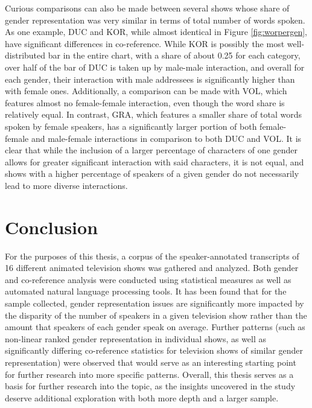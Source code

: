 \documentclass[a4paper, 11pt]{article}
\begin{document}
Curious comparisons can also be made between several shows whose share of gender representation was very similar in terms of total number of words spoken. As one example, DUC and KOR, while almost identical in Figure \ref{fig:worpergen}, have significant differences in co-reference. While KOR is possibly the most well-distributed bar in the entire chart, with a share of about 0.25 for each category, over half of the bar of DUC is taken up by male-male interaction, and overall for each gender, their interaction with male addressees is significantly higher than with female ones. Additionally, a comparison can be made with VOL, which features almost no female-female interaction, even though the word share is relatively equal. In contrast, GRA, which features a smaller share of total words spoken by female speakers, has a significantly larger portion of both female-female and male-female interactions in comparison to both DUC and VOL. It is clear that while the inclusion of a larger percentage of characters of one gender allows for greater significant interaction with said characters, it is not equal, and shows with a higher percentage of speakers of a given gender do not necessarily lead to more diverse interactions.

\section{Conclusion}
For the purposes of this thesis, a corpus of the speaker-annotated transcripts of 16 different animated television shows was gathered and analyzed. Both gender and co-reference analysis were conducted using statistical measures as well as automated natural language processing tools. It has been found that for the sample collected, gender representation issues are significantly more impacted by the disparity of the number of speakers in a given television show rather than the amount that speakers of each gender speak on average. Further patterns (such as non-linear ranked gender representation in individual shows, as well as significantly differing co-reference statistics for television shows of similar gender representation) were observed that would serve as an interesting starting point for further research into more specific patterns. Overall, this thesis serves as a basis for further research into the topic, as the insights uncovered in the study deserve additional exploration with both more depth and a larger sample.

\newpage


\end{document}
